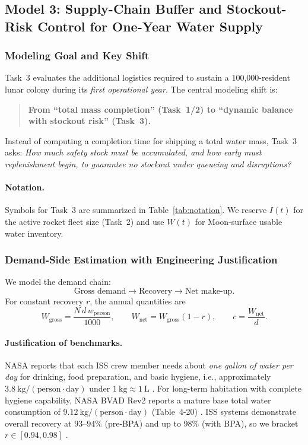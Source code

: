 ﻿\documentclass{mcmthesis}
\begin{document}
\subsection{Model 3: Supply-Chain Buffer and Stockout-Risk Control for One-Year Water Supply}
\label{sec:model3_optimal}

\subsubsection{Modeling Goal and Key Shift}
\label{sec:model3_shift}

Task~3 evaluates the additional logistics required to sustain a 100,000-resident lunar colony during its
\emph{first operational year}. The central modeling shift is:

\begin{quote}
\textbf{From ``total mass completion'' (Task~1/2) to ``dynamic balance with stockout risk'' (Task~3).}
\end{quote}

Instead of computing a completion time for shipping a total water mass, Task~3 asks:
\emph{How much safety stock must be accumulated, and how early must replenishment begin, to guarantee
no stockout under queueing and disruptions?}

\paragraph{Notation.}
Symbols for Task~3 are summarized in Table~\ref{tab:notation}. We reserve $I(t)$ for the active rocket fleet size (Task~2) and use $W(t)$ for Moon-surface usable water inventory.

\subsubsection{Demand-Side Estimation with Engineering Justification}
\label{sec:model3_demand_opt}

We model the demand chain:
\[
\text{Gross demand} \rightarrow \text{Recovery} \rightarrow \text{Net make-up}.
\]
For constant recovery $r$, the annual quantities are
\begin{equation}
W_{\text{gross}}=\frac{N\,d\,w_{\text{person}}}{1000},\qquad
W_{\text{net}}=W_{\text{gross}}(1-r),\qquad
c=\frac{W_{\text{net}}}{d}.
\end{equation}

\paragraph{Justification of benchmarks.}
NASA reports that each ISS crew member needs about \emph{one gallon of water per day}
for drinking, food preparation, and basic hygiene, i.e., approximately
$3.8~\mathrm{kg/(person\cdot day)}$ under $1~\mathrm{kg}\approx 1~\mathrm{L}$
\cite{nasa_water_milestone_iss}.
For long-term habitation with complete hygiene capability, NASA BVAD Rev2 reports a mature base
total water consumption of $9.12~\mathrm{kg/(person\cdot day)}$ (Table~4-20) \cite{bvad_rev2}.
ISS systems demonstrate overall recovery at $93$--$94\%$ (pre-BPA) and up to $98\%$ (with BPA),
so we bracket $r\in[0.94,0.98]$ \cite{nasa_water_milestone_iss}.
\end{document}

